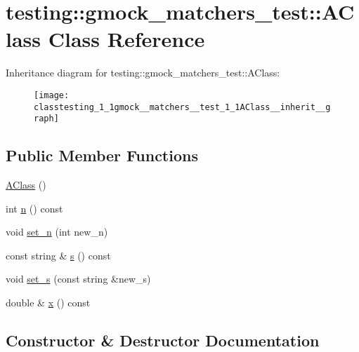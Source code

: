 \hypertarget{classtesting_1_1gmock__matchers__test_1_1AClass}{}\section{testing\+:\+:gmock\+\_\+matchers\+\_\+test\+:\+:A\+Class Class Reference}
\label{classtesting_1_1gmock__matchers__test_1_1AClass}


Inheritance diagram for testing\+:\+:gmock\+\_\+matchers\+\_\+test\+:\+:A\+Class\+:
\nopagebreak
\begin{figure}[H]
\begin{center}
\leavevmode
\texttt{[image: classtesting\_1\_1gmock\_\_matchers\_\_test\_1\_1AClass\_\_inherit\_\_graph]}
\end{center}
\end{figure}
\subsection*{Public Member Functions}
\begin{DoxyCompactItemize}
\item 
\hyperlink{classtesting_1_1gmock__matchers__test_1_1AClass_ac43d717a80bb6fad8c77dc36f963ca88}{A\+Class} ()
\item 
int \hyperlink{classtesting_1_1gmock__matchers__test_1_1AClass_a6fb09c7c4d2314a2f9af9d07b31d02c1}{n} () const 
\item 
void \hyperlink{classtesting_1_1gmock__matchers__test_1_1AClass_a3181466cec6faa5ab3c6bc5c4dbf67b2}{set\+\_\+n} (int new\+\_\+n)
\item 
const string \& \hyperlink{classtesting_1_1gmock__matchers__test_1_1AClass_a4cbf37b13f0f9a2497ef8effc938d0f8}{s} () const 
\item 
void \hyperlink{classtesting_1_1gmock__matchers__test_1_1AClass_a131c5d2da4b5984f5af3fd84898eaf09}{set\+\_\+s} (const string \&new\+\_\+s)
\item 
double \& \hyperlink{classtesting_1_1gmock__matchers__test_1_1AClass_a4480f51cb8e304fc5551712a6507a1c9}{x} () const 
\end{DoxyCompactItemize}


\subsection{Constructor \& Destructor Documentation}
